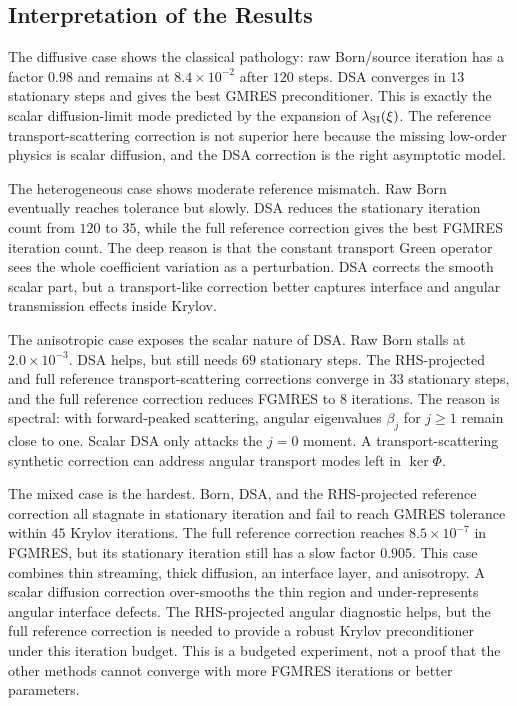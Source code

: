 \documentclass[11pt]{article}
\begin{document}
\subsection{Interpretation of the Results}

The diffusive case shows the classical pathology: raw Born/source iteration
has a factor \(0.98\) and remains at \(8.4\times10^{-2}\) after \(120\)
steps. DSA converges in \(13\) stationary steps and gives the best GMRES
preconditioner. This is exactly the scalar diffusion-limit mode predicted by
the expansion of \(\lambda_{\rm SI}(\xi)\). The reference transport-scattering
correction is not superior here because the missing low-order physics is scalar
diffusion, and the DSA correction is the right asymptotic model.

The heterogeneous case shows moderate reference mismatch. Raw Born eventually
reaches tolerance but slowly. DSA reduces the stationary iteration count from
\(120\) to \(35\), while the full reference correction gives the best FGMRES
iteration count. The
deep reason is that the constant transport Green operator sees the whole
coefficient variation as a perturbation. DSA corrects the smooth scalar part,
but a transport-like correction better captures interface and angular
transmission effects inside Krylov.

The anisotropic case exposes the scalar nature of DSA. Raw Born stalls at
\(2.0\times10^{-3}\). DSA helps, but still needs \(69\) stationary steps.  The
RHS-projected and full reference transport-scattering corrections converge in
\(33\) stationary steps, and the full reference correction reduces FGMRES to
\(8\) iterations. The reason is spectral: with forward-peaked scattering,
angular eigenvalues \(\beta_j\) for \(j\ge1\) remain close to one. Scalar DSA
only attacks the \(j=0\) moment. A transport-scattering synthetic correction
can address angular transport modes left in \(\ker\Phi\).

The mixed case is the hardest. Born, DSA, and the RHS-projected reference
correction all stagnate in stationary
iteration and fail to reach GMRES tolerance within \(45\) Krylov iterations.
The full reference correction reaches \(8.5\times10^{-7}\) in FGMRES, but its
stationary iteration still
has a slow factor \(0.905\). This case combines thin streaming, thick
diffusion, an interface layer, and anisotropy. A scalar diffusion correction
over-smooths the thin region and under-represents angular interface defects.
The RHS-projected angular diagnostic helps, but the full reference correction
is needed to provide a robust Krylov preconditioner under this iteration
budget. This is a budgeted experiment, not a proof that the other methods
cannot converge with more FGMRES iterations or better parameters.
\end{document}
